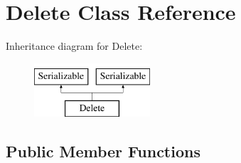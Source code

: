\hypertarget{class_delete}{}\section{Delete Class Reference}
\label{class_delete}
Inheritance diagram for Delete\+:\begin{figure}[H]
\begin{center}
\leavevmode
\includegraphics[height=2.000000cm]{class_delete}
\end{center}
\end{figure}
\subsection*{Public Member Functions}

